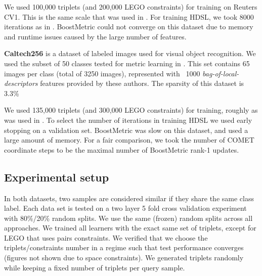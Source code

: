 \documentclass{article} %
\begin{document}
We used 100,000 triplets (and 200,000 LEGO constraints) for training on Reuters CV1. This is the same scale that was used in \cite{hdsl}. For training HDSL, we took 8000 iterations as in \cite{hdsl}. BoostMetric could not converge on this dataset due to memory and runtime issues caused by the large number of features.

\textbf{Caltech256} is a dataset of labeled images used for visual object recognition. We used the subset of 50 classes tested for metric learning in \cite{OASIS}. This set contains 65 images per class (total of 3250 images), represented with ~1000 \textit{bag-of-local-descriptors} features provided by these authors. The sparsity of this dataset is 3.3\%

We used 135,000 triplets (and 300,000 LEGO constraints) for training, roughly as was used in \cite{OASIS}. To select the number of iterations in training HDSL we used early stopping on a validation set. BoostMetric was slow on this dataset, and used a large amount of memory. For a fair comparison, we took the number of COMET coordinate steps to be the maximal number of BoostMetric rank-1 updates.

\subsection{Experimental setup}
In both datasets, two samples are considered similar if they share the same class label. Each data set is tested on a two layer 5 fold cross validation experiment with 80\%/20\% random splits. We use the same (frozen) random splits across all approaches. We trained all learners with the exact same set of triplets, except for LEGO that uses pairs constraints. We verified that we choose the triplets/constraints number in a regime such that test performance converges (figures not shown due to space constraints). We generated triplets randomly while keeping a fixed number of triplets per query sample.
\end{document}
